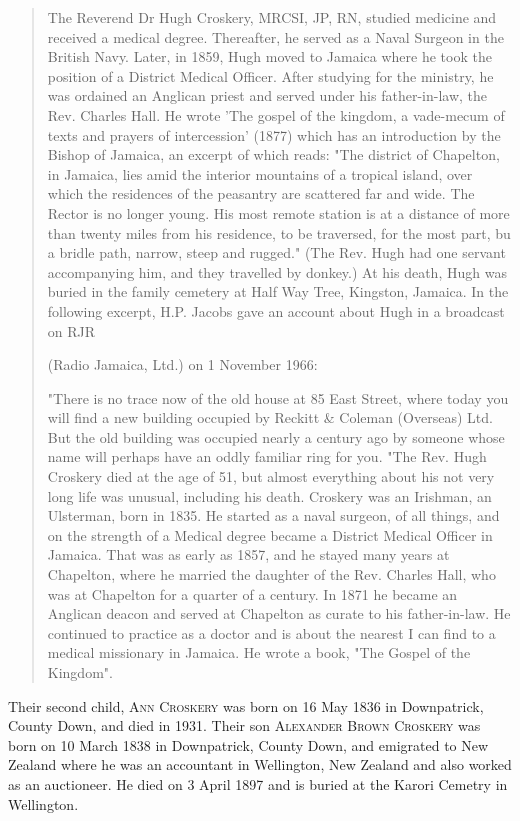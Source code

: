 \begin{quotation}

The Reverend Dr Hugh Croskery, MRCSI, JP, RN, studied medicine and received a medical degree. Thereafter, he served as a Naval Surgeon in the British Navy. Later, in 1859, Hugh moved to Jamaica where he took the position of a District Medical Officer. After studying for the ministry, he was ordained an Anglican priest and served under his father-in-law, the Rev. Charles Hall. He wrote 'The gospel of the kingdom, a vade-mecum of texts and prayers of intercession' (1877) which has an introduction by the Bishop of Jamaica, an excerpt of which reads: "The district of Chapelton, in Jamaica, lies amid the interior mountains of a tropical island, over which the residences of the peasantry are scattered far and wide. The Rector is no longer young. His most remote station is at a distance of more than twenty miles from his residence, to be traversed, for the most part, bu a bridle path, narrow, steep and rugged." (The Rev. Hugh had one servant accompanying him, and they travelled by donkey.) At his death, Hugh was buried in the family cemetery at Half Way Tree, Kingston, Jamaica. In the following excerpt, H.P. Jacobs gave an account about Hugh in a broadcast on RJR 

(Radio Jamaica, Ltd.) on 1 November 1966:

    "There is no trace now of the old house at 85 East Street, where today you will  
    find a new building occupied by Reckitt & Coleman (Overseas) Ltd.  But the old building 
    was occupied nearly a century ago by someone whose name will perhaps  
    have an oddly familiar ring for you. 
         "The Rev. Hugh Croskery died at the age of 51, but almost everything about his  
    not very long life was unusual, including his death. Croskery was an Irishman, an  
    Ulsterman, born in 1835.  He started as a naval surgeon, of all things, and on the  
    strength of a Medical degree became a District Medical Officer in Jamaica. That was  
    as early as 1857, and he stayed many years at Chapelton, where he married the  
    daughter of the Rev. Charles Hall, who was at Chapelton for a quarter of a century.   
    In 1871 he became an Anglican deacon and served at Chapelton as curate to his  
    father-in-law.  He continued to practice as a doctor and is about the nearest I can  
    find to a medical missionary in Jamaica. He wrote a book, "The Gospel of the Kingdom".
    \end{quotation}
    
Their second child, \textsc{Ann Croskery} was born on 16 May 1836 in	Downpatrick, County Down, and died in 1931.
Their son \textsc{Alexander Brown Croskery} was born on 10 March 1838 in	Downpatrick, County Down, and emigrated to New Zealand where he was an accountant in Wellington, New Zealand and also worked as an auctioneer. He died on 3 April 1897 and is buried at the Karori Cemetry in Wellington.

